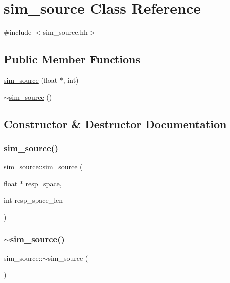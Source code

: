 \hypertarget{classsim__source}{}\section{sim\+\_\+source Class Reference}
\label{classsim__source}


{\ttfamily \#include $<$sim\+\_\+source.\+hh$>$}

\subsection*{Public Member Functions}
\begin{DoxyCompactItemize}
\item 
\mbox{\hyperlink{classsim__source_a4abc46c1dda4adb14e1749875960d676}{sim\+\_\+source}} (float $\ast$, int)
\item 
\mbox{\hyperlink{classsim__source_a797822a44ea214dde3c167d175f7a13c}{$\sim$sim\+\_\+source}} ()
\end{DoxyCompactItemize}


\subsection{Constructor \& Destructor Documentation}
\mbox{\label{classsim__source_a4abc46c1dda4adb14e1749875960d676}} 
\subsubsection{\texorpdfstring{sim\+\_\+source()}{sim\_source()}}
{\footnotesize\ttfamily sim\+\_\+source\+::sim\+\_\+source (\begin{DoxyParamCaption}\item[{float $\ast$}]{resp\+\_\+space,  }\item[{int}]{resp\+\_\+space\+\_\+len }\end{DoxyParamCaption})}

\mbox{\label{classsim__source_a797822a44ea214dde3c167d175f7a13c}} 
\subsubsection{\texorpdfstring{$\sim$sim\+\_\+source()}{~sim\_source()}}
{\footnotesize\ttfamily sim\+\_\+source\+::$\sim$sim\+\_\+source (\begin{DoxyParamCaption}{ }\end{DoxyParamCaption})}



